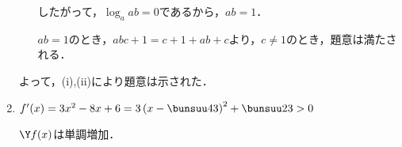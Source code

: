 \begin{enumerate}
\begin{enumerate}
したがって，$\log_aab = 0$であるから，$ab = 1$．

$ab = 1$のとき，$abc + 1 = c+1 + ab + c$より，$c\neq1$のとき，題意は満たされる．
\end{enumerate}

よって，(i),(ii)により題意は示された．
\hfill
{}

\vspace{1zw}

\item $f'(x) = 3x^2 - 8x + 6 = 3\left(x-\bunsuu43 \right)^2 + \bunsuu23 > 0$

$\Y f(x)$は単調増加．

\end{enumerate}

